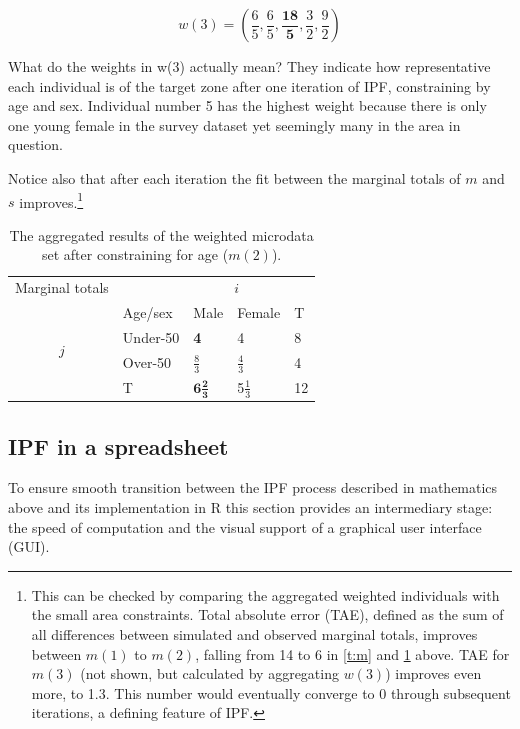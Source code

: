\documentclass[a4paper, 11pt, twoside]{article}
\begin{document}
\begin{equation}
w(3) = (\frac{6}{5}, \frac{6}{5}, \boldsymbol{\frac{18}{5}}, \frac{3}{2},
\frac{9}{2})
\end{equation}

What do the weights in w(3) actually mean? They indicate how representative
each individual is of the target zone after one iteration of IPF, constraining
by age and sex. Individual number 5 has the highest weight because there is
only one young female in the survey dataset yet seemingly many in the area in
question.

Notice also that after each iteration the fit between the marginal
totals of $m$ and $s$
improves.\footnote{This can be checked by comparing the aggregated weighted
individuals with the small area constraints. Total absolute error (TAE),
defined as the sum of all differences between simulated and observed marginal
totals, improves between $m(1)$ to $m(2)$, falling from
14 to 6 in \cref{t:m} and \cref{t:m2} above. TAE for $m(3)$ (not shown,
but calculated by aggregating $w(3)$) improves even more, to 1.3.
This number would eventually converge to 0 through subsequent
iterations, a defining feature of IPF.}


\begin{table}[htbp]
\centering
\caption[Aggregated results after constraining for age]{The
aggregated results of the weighted
microdata set after constraining for age ($m(2)$).
}

\begin{tabular}{cllll}\toprule
Marginal totals&  & \multicolumn{2}{c}{$i$} & \\
& Age/sex & Male & Female & T\\ \midrule
\multirow{2}{*}{$j$} & Under-50 & \textbf{4} & 4 & 8\\
& Over-50 & $\frac{8}{3}$ & $\frac{4}{3}$ & 4 \\
& T & $\boldsymbol{6\frac{2}{3}}$ & 5$\frac{1}{3}$ & 12\\
\bottomrule
\end{tabular}
\label{t:m2}
\end{table}


\subsection{IPF in a spreadsheet}
To ensure smooth transition between the IPF process
described in mathematics above and its implementation in R this section
provides an intermediary stage: the speed of computation and the visual support
of a graphical user interface (GUI).
\end{document}
